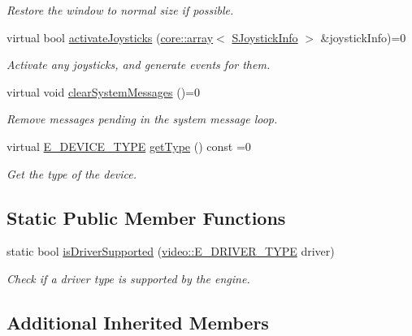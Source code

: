 \begin{DoxyCompactItemize}
\begin{DoxyCompactList}\small\item\em Restore the window to normal size if possible. \end{DoxyCompactList}\item 
virtual bool \hyperlink{classirr_1_1IrrlichtDevice_af06f8d2c4fdffd1f879e46685bcbc6e3}{activate\+Joysticks} (\hyperlink{classirr_1_1core_1_1array}{core\+::array}$<$ \hyperlink{structirr_1_1SJoystickInfo}{S\+Joystick\+Info} $>$ \&joystick\+Info)=0
\begin{DoxyCompactList}\small\item\em Activate any joysticks, and generate events for them. \end{DoxyCompactList}\item 
virtual void \hyperlink{classirr_1_1IrrlichtDevice_aa10c6151a267d8a1500d5dc7b44425dd}{clear\+System\+Messages} ()=0
\begin{DoxyCompactList}\small\item\em Remove messages pending in the system message loop. \end{DoxyCompactList}\item 
virtual \hyperlink{namespaceirr_ac25d94cf2e1037c7ca18ee79b3bd4505}{E\+\_\+\+D\+E\+V\+I\+C\+E\+\_\+\+T\+Y\+PE} \hyperlink{classirr_1_1IrrlichtDevice_a644d7e8416cf1be387cdf447de743716}{get\+Type} () const  =0
\begin{DoxyCompactList}\small\item\em Get the type of the device. \end{DoxyCompactList}\end{DoxyCompactItemize}
\subsection*{Static Public Member Functions}
\begin{DoxyCompactItemize}
\item 
static bool \hyperlink{classirr_1_1IrrlichtDevice_a5a74995aec731b26c6a9cb5bea6842fe}{is\+Driver\+Supported} (\hyperlink{namespaceirr_1_1video_ae35a6de6d436c76107ad157fe42356d0}{video\+::\+E\+\_\+\+D\+R\+I\+V\+E\+R\+\_\+\+T\+Y\+PE} driver)
\begin{DoxyCompactList}\small\item\em Check if a driver type is supported by the engine. \end{DoxyCompactList}\end{DoxyCompactItemize}
\subsection*{Additional Inherited Members}


